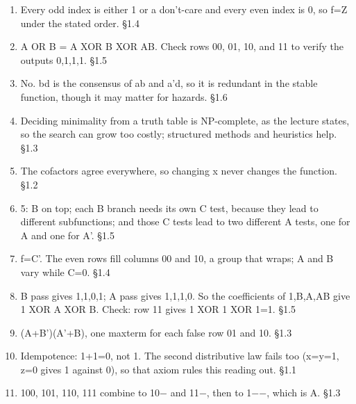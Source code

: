 \documentclass[11pt]{article}
\begin{document}
\begin{keepsection}
\begin{enumerate}
\item Every odd index is either 1 or a don’t-care and every even index is 0, so f=Z under the stated order. \hfill{\small\color{FAUblue}§1.4}
\item A OR B = A XOR B XOR AB. Check rows 00, 01, 10, and 11 to verify the outputs 0,1,1,1. \hfill{\small\color{FAUblue}§1.5}
\item No. bd is the consensus of ab and a'd, so it is redundant in the stable function, though it may matter for hazards. \hfill{\small\color{FAUblue}§1.6}
\item Deciding minimality from a truth table is NP-complete, as the lecture states, so the search can grow too costly; structured methods and heuristics help. \hfill{\small\color{FAUblue}§1.3}
\item The cofactors agree everywhere, so changing x never changes the function. \hfill{\small\color{FAUblue}§1.2}
\item 5: B on top; each B branch needs its own C test, because they lead to different subfunctions; and those C tests lead to two different A tests, one for A and one for A'. \hfill{\small\color{FAUblue}§1.5}
\item f=C'. The even rows fill columns 00 and 10, a group that wraps; A and B vary while C=0. \hfill{\small\color{FAUblue}§1.4}
\item B pass gives 1,1,0,1; A pass gives 1,1,1,0. So the coefficients of 1,B,A,AB give 1 XOR A XOR B. Check: row 11 gives 1 XOR 1 XOR 1=1. \hfill{\small\color{FAUblue}§1.5}
\item (A+B')(A'+B), one maxterm for each false row 01 and 10. \hfill{\small\color{FAUblue}§1.3}
\item Idempotence: 1+1=0, not 1. The second distributive law fails too (x=y=1, z=0 gives 1 against 0), so that axiom rules this reading out. \hfill{\small\color{FAUblue}§1.1}
\item 100, 101, 110, 111 combine to 10\ensuremath{-} and 11\ensuremath{-}, then to 1\ensuremath{-}\ensuremath{-}, which is A. \hfill{\small\color{FAUblue}§1.3}
\end{enumerate}

\end{keepsection}
\end{document}
